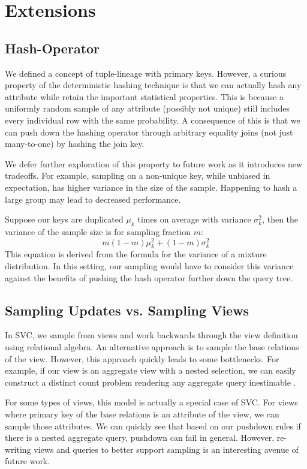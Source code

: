 \section{Extensions}\label{sec:ext}
\subsection{Hash-Operator}
We defined a concept of tuple-lineage with primary keys.
However, a curious property of the deterministic hashing technique is that we can actually hash any attribute while retain the important
statistical properties.
This is because a uniformly random sample of any attribute (possibly not unique) still includes every individual row with the same probability.  
A consequence of this is that we can push down the hashing operator through arbitrary equality joins (not just many-to-one) by hashing the join key.

We defer further exploration of this property to future work as it introduces new tradeoffs.
For example, sampling on a non-unique key, while unbiased in expectation, has higher variance in the size of the sample.
Happening to hash a large group may lead to decreased performance. 

Suppose our keys are duplicated $\mu_k$ times on average with variance $\sigma_k^2$, then the variance of the
sample size is for sampling fraction $m$:
\[m(1-m)\mu_k^2+(1-m)\sigma_k^2\]
This equation is derived from the formula for the variance of a mixture distribution.
In this setting, our sampling would have to consider this variance against the benefits of pushing the hash operator further down the query tree. 

\subsection{Sampling Updates vs. Sampling Views}
In SVC, we sample from views and work backwards through the view definition using relational algebra.
An alternative approach is to sample the base relations of the view.
However, this approach quickly leads to some bottlenecks.
For example, if our view is an aggregate view with a nested selection, we can easily construct a distinct count problem rendering any aggregate query inestimable \cite{DBLP:conf/pods/CharikarCMN00}.

For some types of views, this model is actually a special case of SVC.
For views where primary key of the base relations is an attribute of the view, we can sample those attributes.
We can quickly see that based on our pushdown rules if there is a nested aggregate query, pushdown can fail in general.
However, re-writing views and queries to better support sampling is an interesting avenue of future work.

